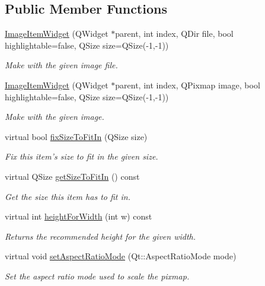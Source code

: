 \subsection*{Public Member Functions}
\begin{DoxyCompactItemize}
\item 
\hyperlink{class_u_i_1_1_image_item_widget_a1498aa55e5c247c0fc2764e5b8e5006b}{Image\-Item\-Widget} (Q\-Widget $\ast$parent, int index, Q\-Dir file, bool highlightable=false, Q\-Size size=Q\-Size(-\/1,-\/1))
\begin{DoxyCompactList}\small\item\em Make with the given image file. \end{DoxyCompactList}\item 
\hyperlink{class_u_i_1_1_image_item_widget_a972d018803c6bf7c1caff319340530fc}{Image\-Item\-Widget} (Q\-Widget $\ast$parent, int index, Q\-Pixmap image, bool highlightable=false, Q\-Size size=Q\-Size(-\/1,-\/1))
\begin{DoxyCompactList}\small\item\em Make with the given image. \end{DoxyCompactList}\item 
virtual bool \hyperlink{class_u_i_1_1_image_item_widget_af34ec1c5fc8083772dbf818b50525e9b}{fix\-Size\-To\-Fit\-In} (Q\-Size size)
\begin{DoxyCompactList}\small\item\em Fix this item's size to fit in the given size. \end{DoxyCompactList}\item 
virtual Q\-Size \hyperlink{class_u_i_1_1_image_item_widget_a5b316739170d20dce3ea08af9547feca}{get\-Size\-To\-Fit\-In} () const 
\begin{DoxyCompactList}\small\item\em Get the size this item has to fit in. \end{DoxyCompactList}\item 
virtual int \hyperlink{class_u_i_1_1_image_item_widget_af7e15455f32b694cba5295bb5e44f39e}{height\-For\-Width} (int w) const 
\begin{DoxyCompactList}\small\item\em Returns the recommended height for the given width. \end{DoxyCompactList}\item 
virtual void \hyperlink{class_u_i_1_1_image_item_widget_a27642c6a403d606f6c96eca9079ac3c8}{set\-Aspect\-Ratio\-Mode} (Qt\-::\-Aspect\-Ratio\-Mode mode)
\begin{DoxyCompactList}\small\item\em Set the aspect ratio mode used to scale the pixmap. \end{DoxyCompactList}\item 

\end{DoxyCompactItemize}
